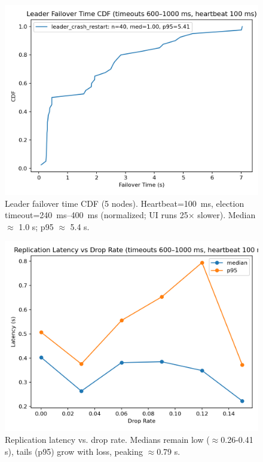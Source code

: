 \documentclass[11pt]{article}
\begin{document}
\begin{figure}[t]
  \centering
  \includegraphics[width=\columnwidth]{figures/failover_cdf.png}
  \caption{Leader failover time CDF (5 nodes). Heartbeat=\SI{100}{ms}, election timeout=\SIrange{240}{400}{ms} (normalized; UI runs 25$\times$ slower). Median $\approx$ 1.0 s; p95 $\approx$ 5.4 s.}
  \label{fig:failover}
\end{figure}

\begin{figure}[t]
  \centering
  \includegraphics[width=\columnwidth]{figures/replication_latency_vs_drop.png}
  \caption{Replication latency vs. drop rate. Medians remain low ($\approx$0.26-0.41 s), tails (p95) grow with loss, peaking $\approx$0.79 s.}
  \label{fig:latency}
\end{figure}
\end{document}
